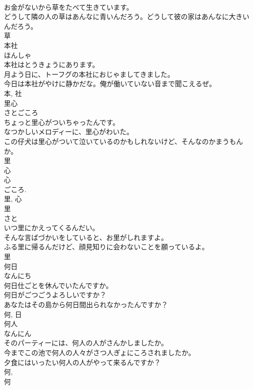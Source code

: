 \documentclass[8pt]{extreport}
\begin{document}
\begin{CJK}{UTF8}{min}
\\	お金がないから草をたべて生きています。	
\\	どうして隣の人の草はあんなに青いんだろう。どうして彼の家はあんなに大きいんだろう。	
\\	草	
\\	本社	
\\	ほんしゃ	
\\	本社はとうきょうにあります。	
\\	月よう日に、トーフグの本社におじゃましてきました。	
\\	今日は本社がやけに静かだな。俺が働いていない音まで聞こえるぜ。	
\\	本, 社	
\\	里心	
\\	さとごころ	
\\	ちょっと里心がついちゃったんです。	
\\	なつかしいメロディーに、里心がわいた。	
\\	この仔犬は里心がついて泣いているのかもしれないけど、そんなのかまうもんか。	
\\	里 
\\	心 
\\	心 
\\	ごころ. 
\\	里, 心	
\\	里	
\\	さと	
\\	いつ里にかえってくるんだい。	
\\	そんな言ばづかいをしていると、お里がしれますよ。	
\\	ふる里に帰るんだけど、顔見知りに会わないことを願っているよ。	
\\	里	
\\	何日	
\\	なんにち	
\\	何日仕ごとを休んでいたんですか。	
\\	何日がごつごうよろしいですか？	
\\	あなたはその島から何日間出られなかったんですか？	
\\	何, 日	
\\	何人	
\\	なんにん	
\\	そのパーティーには、何人の人がさんかしましたか。	
\\	今までこの池で何人の人々がさつ人ぎょにころされましたか。	
\\	夕食にはいったい何人の人がやって来るんですか？	
\\	何, 
\\	何 

\end{CJK}
\end{document}

